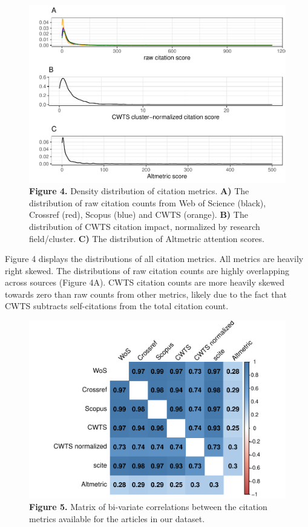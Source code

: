 \documentclass[
  english,
  man,floatsintext]{apa6}
\begin{document}
\begin{figure}
\centering
\includegraphics{RVcn_feasibility_in_social_neuroscience_files/figure-latex/fig4-1.pdf}
\caption{\label{fig:fig4}\textbf{Figure 4.} Density distribution of citation metrics. \textbf{A)} The distribution of raw citation counts from Web of Science (black), Crossref (red), Scopus (blue) and CWTS (orange). \textbf{B)} The distribution of CWTS citation impact, normalized by research field/cluster. \textbf{C)} The distribution of Altmetric attention scores.}
\end{figure}

Figure 4 displays the distributions of all citation metrics. All metrics are heavily right skewed. The distributions of raw citation counts are highly overlapping across sources (Figure 4A). CWTS citation counts are more heavily skewed towards zero than raw counts from other metrics, likely due to the fact that CWTS subtracts self-citations from the total citation count.

\begin{figure}
\centering
\includegraphics{RVcn_feasibility_in_social_neuroscience_files/figure-latex/fig5-1.pdf}
\caption{\label{fig:fig5}\textbf{Figure 5.} Matrix of bi-variate correlations between the citation metrics available for the articles in our dataset.}
\end{figure}
\end{document}
